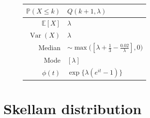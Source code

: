 \documentclass[a4paper,11pt]{article}
\theoremstyle{plain}
\theoremstyle{definition}
\newcommand{\ME}{\mathbb{E}}
\newcommand{\MP}{\mathbb{P}}
\newcommand{\Var}{\operatorname{Var}}
\begin{document}
\begin{figure}[!htb]
\begin{minipage}{0.4\textwidth}
\begin{tabular}{| r | l |}
					\hline
					$\MP(X \leq k)$ & $Q(k+1, \lambda)$ \\
					\hline
					$\ME[X]$ & $ \lambda$ \\
					\hline
					$\Var(X)$ & $\lambda$ \\
					\hline
					Median & $\sim \max\big([\lambda + \frac{1}{3} - \frac{0.02}{\lambda}], 0\big) $ \\
					\hline
					Mode & $[\lambda]$ \\
					\hline
					$\phi(t)$ & $ \exp \{ \lambda(e^{it}-1) \}  $ \\
					\hline
				\end{tabular}
			\end{minipage}
		\end{figure}
	
	\pagebreak
	\section{Skellam distribution}
	
\end{document}
